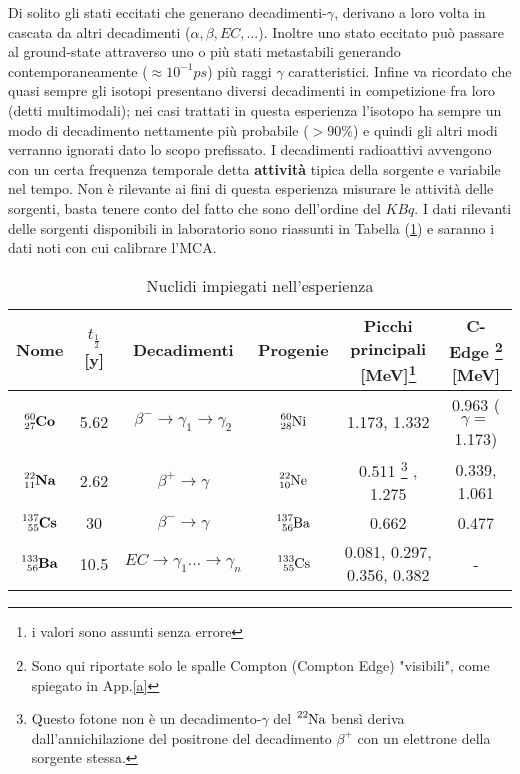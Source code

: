 \documentclass[12pt,a4paper,openright,twoside]{article}
\numberwithin{equation}{section} %
\begin{document}
Di solito gli stati eccitati che generano decadimenti-$\gamma$, derivano a loro volta in cascata da altri decadimenti ($\alpha, \beta , EC ,...$). Inoltre uno stato eccitato può passare al ground-state attraverso uno o più stati metastabili generando contemporaneamente ($\approx 10^{-1} ps$) più raggi $\gamma$ caratteristici. Infine va ricordato che quasi sempre gli isotopi presentano diversi decadimenti in competizione fra loro (detti multimodali); nei casi trattati in questa esperienza l'isotopo ha sempre un modo di decadimento nettamente più probabile ($>90 \% $) e quindi gli altri modi verranno ignorati dato lo scopo prefissato.
I decadimenti radioattivi avvengono con un certa frequenza temporale detta \textbf{attività} tipica della sorgente e variabile nel tempo. Non è rilevante ai fini di questa esperienza misurare le attività delle sorgenti, basta tenere conto del fatto che sono dell'ordine del $KBq$.
I dati rilevanti delle sorgenti disponibili in laboratorio  sono riassunti in Tabella (\ref{nuclidi}) e saranno i dati noti con cui calibrare l'MCA.

\begin{table}[]

\renewcommand\arraystretch{1.2}
\centering 
\begin{tabular}{|c|c|c|c|c|c|}
\hline
Nome & $t_{\frac{1}{2}}$ [y] & Decadimenti  & Progenie & Picchi principali [MeV]\footnote{i valori sono assunti senza errore}& C-Edge \footnote{Sono qui riportate solo le spalle Compton (Compton Edge) "visibili", come spiegato in App.\ref{a}} [MeV]\\ \hline
      $\ce{^{60}_{27} \mathbf{Co}}$  & 5.62   &    $\beta^{-} \rightarrow \gamma_1 \rightarrow \gamma_2 $         &     $\ce{^{60}_{28}Ni}$     &  1.173, 1.332  & 0.963 ($\gamma =$ 1.173) \\ \hline
      
       $\ce{^{22}_{11}\mathbf{Na}}$    &   2.62       &    $\beta^{+} \rightarrow \gamma    $    &    $ \ce{^{22}_{10}Ne}$     &         0.511 \footnote{Questo fotone non è un decadimento-$\gamma$ del $\ce{^{22}Na}$ bensì deriva dall'annichilazione del positrone del decadimento $\beta^{+} $ con un elettrone della sorgente stessa. }   , 1.275    & 0.339, 1.061 \\ \hline
       $\ce{^{137}_{55}\mathbf{Cs}}$   &     30    &    $\beta^{-} \rightarrow \gamma    $         &    $\ce{^{137}_{56}Ba}$      &     0.662        &  0.477    \\ \hline
       $\ce{^{133}_{56}\mathbf{Ba}}$    &     10.5    &       $EC \rightarrow \gamma_1 ...\rightarrow \gamma_n   $   &    $\ce{^{133}_{55}Cs}$      &         0.081, 0.297, 0.356, 0.382    &  - \\ \hline
       
\end{tabular}
     \caption{Nuclidi impiegati nell'esperienza}
     \label{nuclidi}
\end{table}
\end{document}
